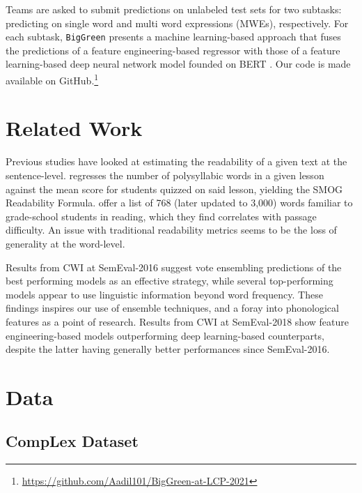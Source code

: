\documentclass[11pt,a4paper]{article}
\begin{document}
Teams are asked to submit predictions on unlabeled test sets for two subtasks: predicting on single word and multi word expressions (MWEs), respectively. For each subtask, \texttt{BigGreen} presents a machine learning-based approach that fuses the predictions of a feature engineering-based regressor with those of a feature learning-based deep neural network model founded on BERT \citep{DBLP:journals/corr/abs-1810-04805}. Our code is made available on GitHub.\footnote{\url{https://github.com/Aadil101/BigGreen-at-LCP-2021}}

\section{Related Work}

Previous studies have looked at estimating the readability of a given text at the sentence-level. \citet{10.2307/40011226} regresses the number of polysyllabic words in a given lesson against the mean score for students quizzed on said lesson, yielding the SMOG Readability Formula. \citet{10.2307/1473169} offer a list of 768 (later updated to 3,000) words familiar to grade-school students in reading, which they find correlates with passage difficulty. An issue with traditional readability metrics seems to be the loss of generality at the word-level.

Results from CWI at SemEval-2016 \citep{zampieriEtAl:2017:NLPTEA} suggest vote ensembling predictions of the best performing models as an effective strategy, while several top-performing models \citep{paetzoldspecia2016sv000gg, ronzanoetal2016taln, mukherjeeetal2016ju} appear to use linguistic information beyond word frequency. These findings inspires our use of ensemble techniques, and a foray into phonological features as a point of research. Results from CWI at SemEval-2018 show feature engineering-based models outperforming deep learning-based counterparts, despite the latter having generally better performances since SemEval-2016.

\section{Data}

\subsection{CompLex Dataset}
\end{document}
